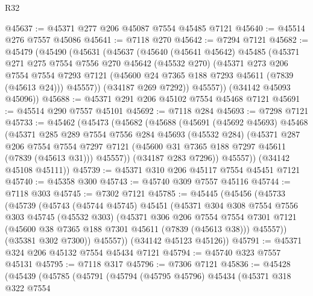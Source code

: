 \begin{lexlean}{R32}
\begin{coremodule}
@45637 := @45371 @277 @206 @45087 @7554 @45485 @7121
@45640 := @45514 @276 @7557 @45086
@45641 := @7118 @270
@45642 := @7294 @7121
@45682 := @45479
    (@45490
      (@45631
        (@45637
          (@45640
            (@45641 @45642)
            @45485
            (@45371
              @271
              @275
              @7554
              @7556
              @270
              @45642
              (@45532 @270)
              (@45371
                @273
                @206
                @7554
                @7554
                @7293
                @7121
                (@45600 @24 @7365 @188 @7293 @45611 (@7839 (@45613 @24)))
                @45557))
            (@34187 @269 @7292))
          @45557))
      (@34142 @45093 @45096))
@45688 := @45371 @291 @206 @45102 @7554 @45468 @7121
@45691 := @45514 @290 @7557 @45101
@45692 := @7118 @284
@45693 := @7298 @7121
@45733 := @45462
    (@45473
      (@45682
        (@45688
          (@45691
            (@45692 @45693)
            @45468
            (@45371
              @285
              @289
              @7554
              @7556
              @284
              @45693
              (@45532 @284)
              (@45371
                @287
                @206
                @7554
                @7554
                @7297
                @7121
                (@45600 @31 @7365 @188 @7297 @45611 (@7839 (@45613 @31)))
                @45557))
            (@34187 @283 @7296))
          @45557))
      (@34142 @45108 @45111))
@45739 := @45371 @310 @206 @45117 @7554 @45451 @7121
@45740 := @45358 @300
@45743 := @45740 @309 @7557 @45116
@45744 := @7118 @303
@45745 := @7302 @7121
@45785 := @45445
    (@45456
      (@45733
        (@45739
          (@45743
            (@45744 @45745)
            @45451
            (@45371
              @304
              @308
              @7554
              @7556
              @303
              @45745
              (@45532 @303)
              (@45371
                @306
                @206
                @7554
                @7554
                @7301
                @7121
                (@45600 @38 @7365 @188 @7301 @45611 (@7839 (@45613 @38)))
                @45557))
            (@35381 @302 @7300))
          @45557))
      (@34142 @45123 @45126))
@45791 := @45371 @324 @206 @45132 @7554 @45434 @7121
@45794 := @45740 @323 @7557 @45131
@45795 := @7118 @317
@45796 := @7306 @7121
@45836 := @45428
    (@45439
      (@45785
        (@45791
          (@45794
            (@45795 @45796)
            @45434
            (@45371
              @318
              @322
              @7554

\end{coremodule}
\end{lexlean}
